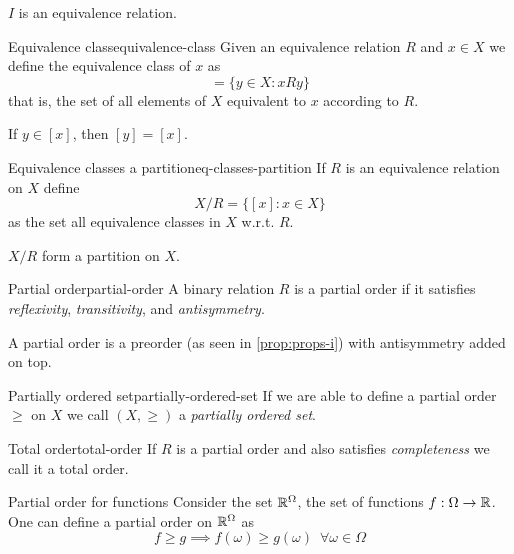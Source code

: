 \documentclass[12pt]{extarticle}
\begin{document}
\begin{corollary}{}{}
    $I$ is an equivalence relation.
\end{corollary}

\begin{definition}{Equivalence class}{equivalence-class}
    Given an equivalence relation $R$ and $x \in X$ we define the equivalence class of $x$ as
    \begin{equation}
        [x] = \{y \in X : xRy\}
    \end{equation}
    that is, the set of all elements of $X$ equivalent to $x$ according to $R$.
\end{definition}

\begin{lemma}{}{}
    If $y \in [x]$, then $[y] = [x]$.
\end{lemma}

\begin{proposition}{Equivalence classes a partition}{eq-classes-partition}
    If $R$ is an equivalence relation on $X$ define
    \begin{equation}
        X/R = \{ [x] : x\in X \}
    \end{equation}
    as the set all equivalence classes in $X$ w.r.t. $R$.

    $X/R$ form a partition on $X$.
\end{proposition}

\begin{definition}{Partial order}{partial-order}
    A binary relation $R$ is a partial order if it satisfies \textit{reflexivity}, \textit{transitivity}, and \textit{antisymmetry}.
\end{definition}

A partial order is a preorder (as seen in \cref{prop:props-i}) with antisymmetry added on top.

\begin{remark}{Partially ordered set}{partially-ordered-set}
    If we are able to define a partial order $\geq$ on $X$ we call $(X, \geq)$ a \emph{partially ordered set}.
\end{remark}


\begin{remark}{Total order}{total-order}
    If $R$ is a partial order and also satisfies \emph{completeness} we call it a total order.
\end{remark}

\begin{example}{Partial order for functions}{}
    Consider the set $\mathbb{R}^\Omega$, the set of functions $f: \Omega \to \mathbb{R}$.
    One can define a partial order on $\mathbb{R}^\Omega$ as
    \begin{equation}
        f \geq g \implies f(\omega) \geq g(\omega) \enspace \forall \omega \in \Omega
    \end{equation}

\end{example}
\end{document}
